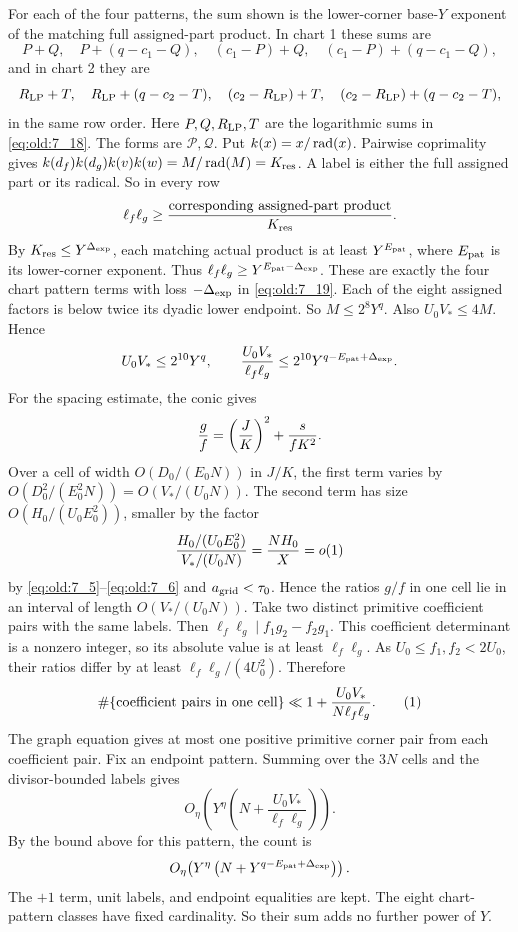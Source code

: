 \begin{enumerate}
For each of the four patterns, the sum shown is the lower-corner
base-\(Y\) exponent of the matching full assigned-part product. In
chart 1 these sums are
\[
 P+Q,\quad P+(q-c_1-Q),\quad(c_1-P)+Q,\quad
 (c_1-P)+(q-c_1-Q),
\]
and in chart 2 they are
\[
 R_{\rm LP}+T,\quad R_{\rm LP}+(q-c_2-T),\quad
 (c_2-R_{\rm LP})+T,\quad
 (c_2-R_{\rm LP})+(q-c_2-T),
\]
in the same row order. Here \(P,Q,R_{\rm LP},T\) are the logarithmic sums
in \eqref{eq:old:7_18}. The forms are \(\mathcal P,\mathcal Q\). Put
\(k(x)=x/\operatorname{rad}(x)\). Pairwise coprimality gives
\(k(d_f)k(d_g)k(v)k(w)=M/\operatorname{rad}(M)=K_{\rm res}\). A label is either the
full assigned part or its radical. So in every row
\[
 \ell_f\ell_g\ge
 \frac{\text{corresponding assigned-part product}}{K_{\rm res}}.
\]
By \(K_{\rm res}\le Y^{\Delta_{\rm exp}}\), each matching actual
product is at least \(Y^{E_{\rm pat}}\), where \(E_{\rm pat}\) is its
lower-corner exponent. Thus
\(\ell_f\ell_g\ge Y^{E_{\rm pat}-\Delta_{\rm exp}}\). These are exactly
the four chart pattern terms with loss \(-\Delta_{\rm exp}\) in
\eqref{eq:old:7_19}.
Each of the eight assigned factors is below twice its dyadic lower
endpoint. So \(M\le2^8Y^q\). Also \(U_0V_*\le4M\). Hence
\[
 U_0V_*\le2^{10}Y^q,\qquad
 \frac{U_0V_*}{\ell_f\ell_g}
 \le2^{10}Y^{q-E_{\rm pat}+\Delta_{\rm exp}}.
\]
For the spacing estimate, the conic gives
\[
 {g\over f}=\left({J\over K}\right)^2+{s\over fK^2}.
\]
Over a cell of width \(O(D_0/(E_0N))\) in \(J/K\), the first term
varies by \(O(D_0^2/(E_0^2N))=O(V_*/(U_0N))\). The second term has
size \(O(H_0/(U_0E_0^2))\), smaller by the factor
\[
 {H_0/(U_0E_0^2)\over V_*/(U_0N)}={NH_0\over X}=o(1)
\]
by \eqref{eq:old:7_5}--\eqref{eq:old:7_6} and \(a_{\rm grid}<\tau_0\).
Hence the ratios \(g/f\)
in one cell lie in an interval of length \(O(V_*/(U_0N))\). Take two
distinct primitive coefficient pairs with the same labels. Then
\(\ell_f\ell_g\mid f_1g_2-f_2g_1\). This coefficient determinant is a
nonzero integer, so its absolute value is at least \(\ell_f\ell_g\). As
\(U_0\le f_1,f_2<2U_0\), their ratios differ by at least
\(\ell_f\ell_g/(4U_0^2)\). Therefore
\[
 \#\{\text{coefficient pairs in one cell}\}
 \ll 1+\frac{U_0V_*}{N \ell_f\ell_g}.
\AutoTag{eq:old:7_17}
\]
The graph equation gives at most one positive primitive corner
pair from each coefficient pair. Fix an endpoint pattern.
Summing over the \(3N\) cells and the divisor-bounded labels gives
\[
 O_\eta\!\left(Y^\eta\left(N+
 \frac{U_0V_*}{\ell_f\ell_g}\right)\right).
\]
By the bound above for this pattern, the count is
\[
 O_\eta\!\left(Y^\eta\left(N+
 Y^{q-E_{\rm pat}+\Delta_{\rm exp}}\right)\right).
\]
The \(+1\) term, unit labels, and endpoint equalities are kept. The
eight chart-pattern classes have fixed cardinality. So their sum adds no
further power of \(Y\).
\end{enumerate}
